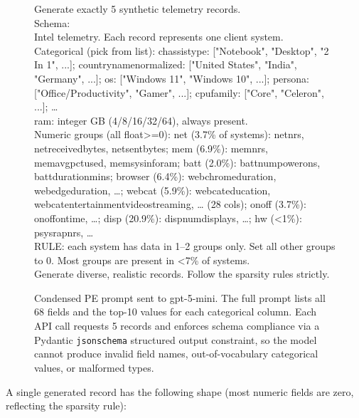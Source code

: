 \documentclass[12pt,letterpaper]{article}
\renewcommand{\_}{\textunderscore\allowbreak}
\begin{document}
\begin{figure}[H]
\centering
\begin{tcolorbox}[colback=gray!5, colframe=gray!60, fontupper=\scriptsize\ttfamily, title={\scriptsize\bfseries PE prompt (condensed)}, left=2mm, right=2mm, top=1mm, bottom=1mm]
Generate exactly 5 synthetic telemetry records.\\[2pt]
Schema:\\
Intel telemetry. Each record represents one client system.\\
Categorical (pick from list): chassistype: ["Notebook", "Desktop", "2 In 1", ...]; countryname\_normalized: ["United States", "India", "Germany", ...]; os: ["Windows 11", "Windows 10", ...]; persona: ["Office/Productivity", "Gamer", ...]; cpu\_family: ["Core", "Celeron", ...]; \ldots\\
ram: integer GB (4/8/16/32/64), always present.\\
Numeric groups (all float>=0): net (3.7\% of systems): net\_nrs, net\_received\_bytes, net\_sent\_bytes; mem (6.9\%): mem\_nrs, mem\_avg\_pct\_used, mem\_sysinfo\_ram; batt (2.0\%): batt\_num\_power\_ons, batt\_duration\_mins; browser (6.4\%): web\_chrome\_duration, web\_edge\_duration, \ldots; webcat (5.9\%): webcat\_education, webcat\_entertainment\_video\_streaming, \ldots{} (28 cols); onoff (3.7\%): onoff\_on\_time, \ldots; disp (20.9\%): disp\_num\_displays, \ldots; hw (<1\%): psys\_rap\_nrs, \ldots\\
RULE: each system has data in 1--2 groups only. Set all other groups to 0. Most groups are present in <7\% of systems.\\[2pt]
Generate diverse, realistic records. Follow the sparsity rules strictly.
\end{tcolorbox}
\caption{Condensed PE prompt sent to gpt-5-mini. The full prompt lists all 68 fields and the top-10 values for each categorical column. Each API call requests 5 records and enforces schema compliance via a Pydantic \texttt{json\_schema} structured output constraint, so the model cannot produce invalid field names, out-of-vocabulary categorical values, or malformed types.}
\label{fig:pe-prompt}
\end{figure}

\noindent A single generated record has the following shape (most numeric fields are zero, reflecting the sparsity rule):
\end{document}
